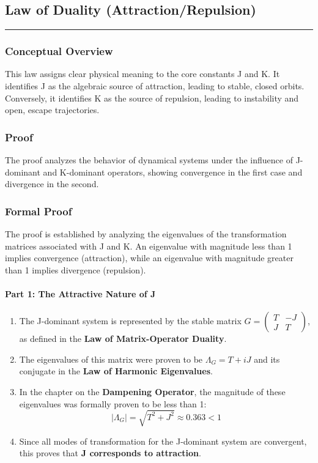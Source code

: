 \subsection*{Law of Duality (Attraction/Repulsion)}
\hrule
\vspace{0.3cm}
\vspace{0.5cm}

\subsubsection*{Conceptual Overview}
This law assigns clear physical meaning to the core constants J and K. It identifies J as the algebraic source of attraction, leading to stable, closed orbits. Conversely, it identifies K as the source of repulsion, leading to instability and open, escape trajectories.

\subsubsection*{Proof}
The proof analyzes the behavior of dynamical systems under the influence of J-dominant and K-dominant operators, showing convergence in the first case and divergence in the second.

\subsubsection*{Formal Proof}
The proof is established by analyzing the eigenvalues of the transformation matrices associated with J and K. An eigenvalue with magnitude less than 1 implies convergence (attraction), while an eigenvalue with magnitude greater than 1 implies divergence (repulsion).

\paragraph{Part 1: The Attractive Nature of J}
\begin{enumerate}
    \item The J-dominant system is represented by the stable matrix $G = \begin{pmatrix} T & -J \\ J & T \end{pmatrix}$, as defined in the \textbf{Law of Matrix-Operator Duality}.
    \item The eigenvalues of this matrix were proven to be $\Lambda_G = T+iJ$ and its conjugate in the \textbf{Law of Harmonic Eigenvalues}.
    \item In the chapter on the \textbf{Dampening Operator}, the magnitude of these eigenvalues was formally proven to be less than 1:
    $$ |\Lambda_G| = \sqrt{T^2+J^2} \approx 0.363 < 1 $$
    \item Since all modes of transformation for the J-dominant system are convergent, this proves that \textbf{J corresponds to attraction}.
\end{enumerate}

